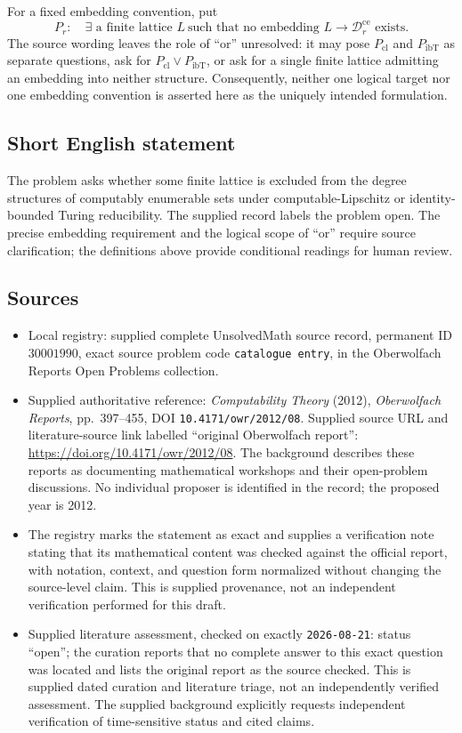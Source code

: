 \documentclass[11pt]{article}
\begin{document}
For a fixed embedding convention, put
\[
P_r:\quad \exists\text{ a finite lattice }L\ \text{such that no embedding }L\longrightarrow\mathcal D_r^{\mathrm{ce}}\text{ exists}.
\]
The source wording leaves the role of ``or'' unresolved: it may pose \(P_{\mathrm{cl}}\) and \(P_{\mathrm{ibT}}\) as separate questions, ask for \(P_{\mathrm{cl}}\lor P_{\mathrm{ibT}}\), or ask for a single finite lattice admitting an embedding into neither structure. Consequently, neither one logical target nor one embedding convention is asserted here as the uniquely intended formulation.
\subsection{Short English statement}
The problem asks whether some finite lattice is excluded from the degree structures of computably enumerable sets under computable-Lipschitz or identity-bounded Turing reducibility. The supplied record labels the problem open. The precise embedding requirement and the logical scope of ``or'' require source clarification; the definitions above provide conditional readings for human review.
\subsection{Sources}
\begin{itemize}
\item Local registry: supplied complete UnsolvedMath source record, permanent ID \(30001990\), exact source problem code \texttt{catalogue entry}, in the Oberwolfach Reports Open Problems collection.
\item Supplied authoritative reference: \emph{Computability Theory} (2012), \emph{Oberwolfach Reports}, pp.~397--455, DOI \texttt{10.4171/owr/2012/08}. Supplied source URL and literature-source link labelled ``original Oberwolfach report'': \url{https://doi.org/10.4171/owr/2012/08}. The background describes these reports as documenting mathematical workshops and their open-problem discussions. No individual proposer is identified in the record; the proposed year is 2012.
\item The registry marks the statement as exact and supplies a verification note stating that its mathematical content was checked against the official report, with notation, context, and question form normalized without changing the source-level claim. This is supplied provenance, not an independent verification performed for this draft.
\item Supplied literature assessment, checked on exactly \texttt{2026-08-21}: status ``open''; the curation reports that no complete answer to this exact question was located and lists the original report as the source checked. This is supplied dated curation and literature triage, not an independently verified assessment. The supplied background explicitly requests independent verification of time-sensitive status and cited claims.
\end{itemize}
\end{document}
